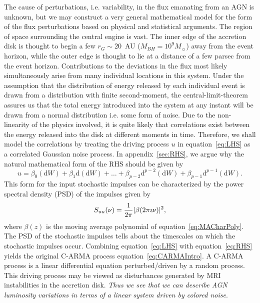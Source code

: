 \documentclass[a4paper,fleqn,usenatbib]{mnras}
\begin{document}
The cause of perturbations, i.e. variability, in the flux emanating from an AGN is unknown, but we may construct a very general mathematical model for the form of the flux perturbations based on physical and statistical arguments. The region of space surrounding the central engine is vast. The inner edge of the accretion disk is thought to begin a few $r_{G} \sim 20$~AU ($M_{BH} = 10^{9} M_{\sun}$) away from the event horizon, while the outer edge is thought to lie at a distance of a few parsec from the event horizon. Contributions to the deviations in the flux most likely simultaneously arise from many individual locations in this system. Under the assumption that the distribution of energy released by each individual event is drawn from a distribution with finite second-moment, the central-limit-theorem assures us that the total energy introduced into the system at any instant will be drawn from a normal distribution i.e. some form of noise. Due to the non-linearity of the physics involved, it is quite likely that correlations exist between the energy released into the disk at different moments in time. Therefore, we shall model the correlations by treating the driving process $u$ in equation~\eqref{eq:LHS} as a correlated Gaussian noise process. In appendix~\ref{sec:RHS}, we argue why the natural mathematical form of the RHS should be given by
\begin{equation}\label{eq:RHS}
u = \beta_{0} (\mathrm{d}W) + \beta_{1} \mathrm{d}(\mathrm{d}W) + \ldots + \beta_{p-2} \mathrm{d}^{p-2}(\mathrm{d}W) + \beta_{p-1} \mathrm{d}^{p-1}(\mathrm{d}W).
\end{equation}
This form for the input stochastic impulses can be characterized by the power spectral density (PSD) of the impulses given by
\begin{equation}\label{eq:ImpulsePSD}
S_{uu}(\nu) = \frac{1}{2 \pi } |\beta(2 \pi \imath \nu)|^{2},
\end{equation}
where $\beta(z)$ is the moving average polynomial of equation~\eqref{eq:MACharPoly}. The PSD of the stochastic impulses tells about the timescales on which the stochastic impulses occur. Combining equation~\eqref{eq:LHS} with equation~\eqref{eq:RHS} yields the original C-ARMA process equation~\eqref{eq:CARMAIntro}. A C-ARMA process is a linear differential equation perturbed/driven by a random process. This driving process may be viewed as disturbances generated by MRI instabilities in the accretion disk. \textit{Thus we see that we can describe AGN luminosity variations in terms of a linear system driven by colored noise}. 
\end{document}
